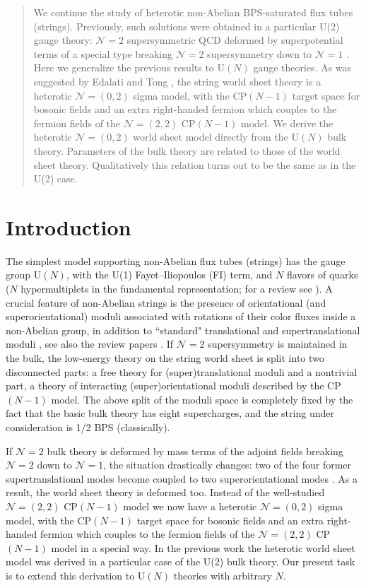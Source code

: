 \documentclass[12pt]{article}
\newcommand{\ntwo}{${\mathcal N}=2$ }
\newcommand{\ntwot}{${\mathcal N}= \left(2,2\right) $ }
\newcommand{\ntwoo}{${\mathcal N}= \left(0,2\right) $ }
\newcommand{\none}{${\mathcal N}=1$ }
\newcommand{\nonen}{${\mathcal N}=1$}
\begin{document}
\begin{titlepage}
\begin{abstract}
We continue the  study of heterotic non-Abelian BPS-saturated flux tubes (strings).
Previously, such solutions were obtained \cite{SYhet} in a particular U(2) gauge theory:
 \ntwo super\-symmetric QCD deformed by
superpotential terms of a special type breaking
\ntwo supersymmetry down to \none$\!\!$. Here we generalize the previous results
to U$(N)$ gauge theories.
As was suggested by Edalati and Tong \cite{Edalati}, the string world sheet theory
is a heterotic \ntwoo 
sigma model, with the CP$(N-1)$ target space for bosonic fields and an extra 
right-handed fermion which couples to the fermion fields of the
\ntwot CP$(N-1)$ model. We derive the heterotic  \ntwoo world sheet
model directly from the U$(N)$ bulk theory. Parameters of the bulk theory are related to those of the world sheet theory. Qualitatively this relation turns out to be  the same as in the U(2) case.


 

\end{abstract}

\end{titlepage}

\section{Introduction}

The simplest model supporting non-Abelian flux tubes (strings)
has the gauge group
U$(N)$, with the U(1) Fayet--Iliopoulos (FI) term,
and $N$ flavors of quarks ($N$ hypermultiplets in the fundamental representation;
for a review see \cite{SYrev}).
A crucial feature of  non-Abelian strings
is the presence of orientational (and superorientational) moduli associated with
rotations of their color fluxes inside a non-Abelian group, in addition to
``standard" translational and supertranslational moduli
\cite{HT1,ABEKY,SYmon,HT2}, see also the review papers \cite{Trev,SYrev,Jrev,Trev2}. 
If \ntwo supersymmetry is maintained in the bulk,
the low-energy theory on the
string world sheet is split into two disconnected parts:
a free theory for (super)translational moduli and a nontrivial part, a theory of
interacting (super)orientational moduli described by the CP$(N-1)$ model.
 The above split of the moduli space
 is completely fixed by the fact
that the basic bulk theory has eight supercharges, and the string under consideration
is 1/2 BPS (classically). 

If \ntwo bulk theory is deformed by mass terms of the adjoint fields
breaking \ntwo down to \nonen, the situation drastically changes:
two of the four former supertranslational modes
become coupled to two superorientational modes \cite{Edalati}.
As a result, the world sheet theory is deformed too.
Instead of the well-studied ${\mathcal N}=(2,2)$ CP$(N-1)$ model we now have
a heterotic \ntwoo 
sigma model, with the CP$(N-1)$ target space for bosonic fields and an extra 
right-handed fermion which couples to the fermion fields of the
\ntwot CP$(N-1)$ model in a special way. In the previous work \cite{SYhet}
the heterotic world sheet model was derived
in a particular case of the U(2) bulk theory. 
Our present task is to extend this derivation
to U$(N)$ theories with arbitrary $N$.
\end{document}
